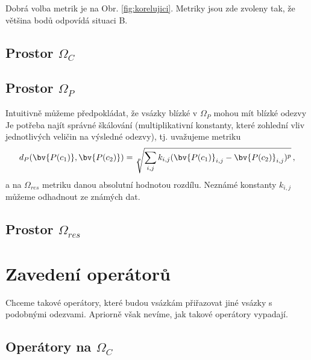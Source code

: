 Dobrá volba metrik je na Obr. \ref{fig:korelujici}. Metriky jsou zde zvoleny tak, že většina bodů odpovídá situaci B.



\subsection{Prostor $\Omega_C$}


\subsection{Prostor $\Omega_P$}
Intuitivně můžeme předpokládat, že vsázky blízké v $\Omega_P$ mohou mít blízké odezvy Je potřeba najít správné škálování (multiplikativní konstanty, které zohlední vliv jednotlivých veličin 
na výsledné odezvy), tj. uvažujeme metriku
\begin{equation}
	d_P (\bv{P(c_1)}, \bv{P(c_2)}) = \sqrt[p]{\sum_{i,j} k_{i,j}(\bv{P(c_1)}_{i,j}-\bv{P(c_2)}_{i,j})^p}\,,
	\label{vaz-p-metrika}
\end{equation}
a na $\Omega_{res}$ metriku danou absolutní hodnotou rozdílu. Neznámé konstanty $k_{i,j}$ můžeme odhadnout 
ze známých dat.



\subsection{Prostor $\Omega_{res}$}

\section{Zavedení operátorů}
Chceme takové operátory, které budou vsázkám přiřazovat jiné vsázky s podobnými odezvami. Apriorně však nevíme, 
jak takové operátory vypadají. 
\subsection{Operátory na $\Omega_C$}
